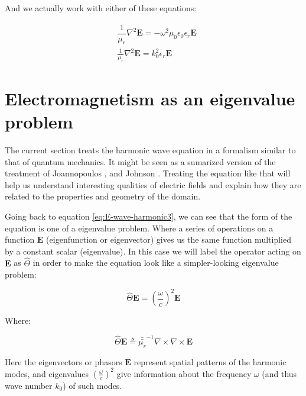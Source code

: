 And we actually work with either of these equations:

\begin{align}
&\dfrac{1}{\mu_r}\nabla^2 \mathbf{E} = -\omega^2\mu_0\epsilon_0\epsilon_r \mathbf{E} \\
&\frac{1}{\mu_r}\nabla^2 \mathbf{E} = k_0^{2}\epsilon_r \mathbf{E} \label{eq:E-wave-harmonic3}
\end{align}

\section{Electromagnetism as an eigenvalue problem}

The current section treats the harmonic wave equation in a formalism similar to that of quantum mechanics. It might be seen as a sumarized version of the treatment of Joannopoulos \cite{Joannopoulos2008}, and Johnson \cite{StevenJohnson2001}. Treating the equation like that will help us understand interesting qualities of electric fields and explain how they are related to the properties and geometry of the domain.

Going back to equation \ref{eq:E-wave-harmonic3}, we can see that the form of the equation is one of a eigenvalue problem. Where a series of operations on a function $\mathbf{E}$ (eigenfunction or eigenvector) gives us the same function multiplied by a constant scalar (eigenvalue).
In this case we will label the operator acting on $\mathbf{E}$ as $\hat{\Theta}$ in order to make the equation look like a simpler-looking eigenvalue problem:

\begin{equation}
\hat{\Theta}\mathbf{E} = \left(\frac{\omega}{c}\right)^2\mathbf{E}
\label{eq:simple_eigproblem}
\end{equation} 

Where:

\begin{equation}
\hat{\Theta}\mathbf{E}\triangleq \bar{\bar{\mu_r}}^{-1}\nabla\times\nabla\times \mathbf{E}
\end{equation}

Here the eigenvectors or phasors $\mathbf{E}$ represent spatial patterns of the harmonic modes, and eigenvalues $ \left( \frac{\omega}{c}\right)^2$ give information about the frequency $\omega$ (and thus wave number $k_0$) of such modes.
